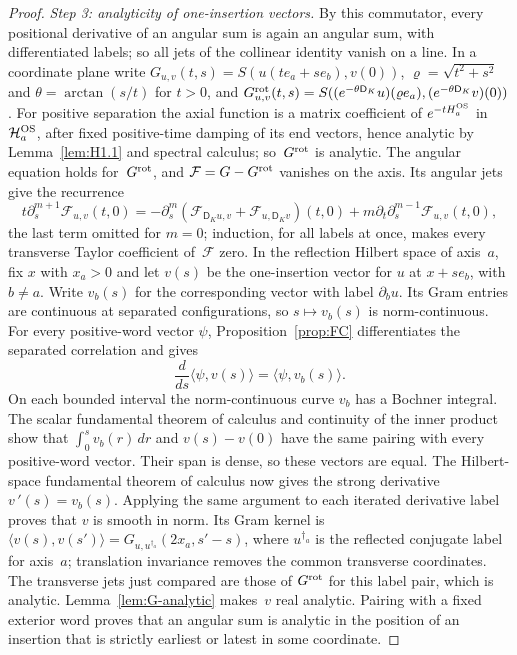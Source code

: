 \begin{proof}
\emph{Step 3: analyticity of one-insertion vectors.} By this commutator, every positional derivative of an angular sum is again an angular sum, with differentiated labels; so all jets of the collinear identity vanish on a line. In a coordinate plane write $G_{u,v}(t,s)=S(u(te_a+se_b),v(0))$, $\varrho=\sqrt{t^2+s^2}$ and $\theta=\arctan(s/t)$ for $t>0$, and $G^{\rm rot}_{u,v}(t,s)=S((e^{-\theta \mathsf D_K}u)(\varrho e_a),(e^{-\theta \mathsf D_K}v)(0))$. For positive separation the axial function is a matrix coefficient of $e^{-tH_a^{\rm OS}}$ in~$\mathcal H_a^{\rm OS}$, after fixed positive-time damping of its end vectors, hence analytic by Lemma~\ref{lem:H1.1} and spectral calculus; so~$G^{\rm rot}$ is analytic. The angular equation holds for~$G^{\rm rot}$, and $\mathcal F=G-G^{\rm rot}$ vanishes on the axis. Its angular jets give the recurrence
\begin{equation*}
t\partial_s^{m+1}\mathcal F_{u,v}(t,0)
=-\partial_s^m(\mathcal F_{\mathsf D_Ku,v}+\mathcal F_{u,\mathsf D_Kv})(t,0)
 +m\partial_t\partial_s^{m-1}\mathcal F_{u,v}(t,0),
\end{equation*}
the last term omitted for $m=0$; induction, for all labels at once, makes every transverse Taylor coefficient of~$\mathcal F$ zero. In the reflection Hilbert space of axis~$a$, fix $x$ with $x_a>0$ and let $v(s)$ be the one-insertion vector for $u$ at $x+se_b$, with $b\ne a$. Write $v_b(s)$ for the corresponding vector with label $\partial_bu$. Its Gram entries are continuous at separated configurations, so $s\mapsto v_b(s)$ is norm-continuous. For every positive-word vector $\psi$, Proposition~\ref{prop:FC} differentiates the separated correlation and gives
\[
 \frac{d}{ds}\langle\psi,v(s)\rangle=\langle\psi,v_b(s)\rangle.
\]
On each bounded interval the norm-continuous curve $v_b$ has a Bochner integral. The scalar fundamental theorem of calculus and continuity of the inner product show that $\int_0^s v_b(r)\,dr$ and $v(s)-v(0)$ have the same pairing with every positive-word vector. Their span is dense, so these vectors are equal. The Hilbert-space fundamental theorem of calculus now gives the strong derivative $v\!\,'(s)=v_b(s)$. Applying the same argument to each iterated derivative label proves that $v$ is smooth in norm. Its Gram kernel is $\langle v(s),v(s')\rangle=G_{u,u^{\dagger_a}}(2x_a,s'-s)$, where $u^{\dagger_a}$ is the reflected conjugate label for axis~$a$; translation invariance removes the common transverse coordinates. The transverse jets just compared are those of $G^{\rm rot}$ for this label pair, which is analytic. Lemma~\ref{lem:G-analytic} makes~$v$ real analytic. Pairing with a fixed exterior word proves that an angular sum is analytic in the position of an insertion that is strictly earliest or latest in some coordinate.


\end{proof}
